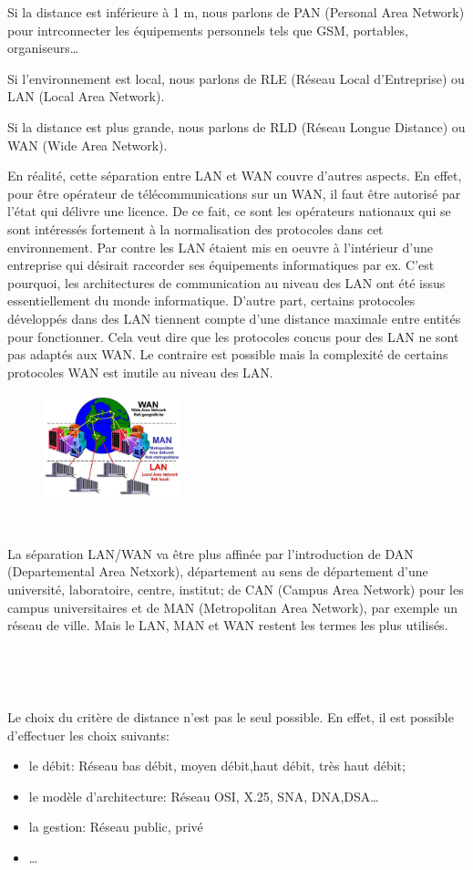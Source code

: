 Si la distance est inférieure à 1 m, nous parlons de PAN (Personal Area Network) pour intrconnecter les équipements personnels tels que GSM, portables, organiseurs\ldots

Si l'environnement est local, nous parlons de RLE (Réseau Local d'Entreprise) ou LAN (Local Area Network).

Si la distance est plus grande, nous parlons de RLD (Réseau Longue Distance) ou WAN (Wide Area Network).

En réalité, cette séparation entre LAN et WAN couvre d'autres aspects. En effet, pour être opérateur de télécommunications sur un WAN, il faut être autorisé par l'état qui délivre une licence. De ce fait, ce sont les opérateurs nationaux qui se sont intéressés fortement à la normalisation des protocoles dans cet environnement. Par contre les LAN étaient mis en oeuvre à l'intérieur d'une entreprise qui désirait raccorder ses équipements informatiques par ex. C'est pourquoi, les architectures de communication au niveau des LAN ont été issus essentiellement du monde informatique. D'autre part, certains protocoles développés dans des LAN tiennent compte d'une distance maximale entre entités pour fonctionner. Cela veut dire que les protocoles concus pour des LAN ne sont pas adaptés aux WAN. Le contraire est possible mais la complexité de certains protocoles WAN est inutile au niveau des LAN.

\begin{figure}
	\includegraphics[width=4cm]{partie1/classification.jpg}
\end{figure}
~

La séparation LAN/WAN va être plus affinée par l'introduction de DAN (Departemental Area Netxork), département au sens de département d'une université, laboratoire, centre, institut; de CAN (Campus Area Network) pour les campus universitaires et de MAN (Metropolitan Area Network), par exemple un réseau de ville. Mais le LAN, MAN et WAN restent les termes les plus utilisés.

~

~

Le choix du critère de distance n'est pas le seul possible. En effet, il est possible d'effectuer les choix suivants:
\begin{itemize}
	\item le débit: Réseau bas débit, moyen débit,haut débit, très haut débit;
	\item le modèle d'architecture: Réseau OSI, X.25, SNA, DNA,DSA\ldots
	\item la gestion: Réseau public, privé
	\item \ldots
\end{itemize}

